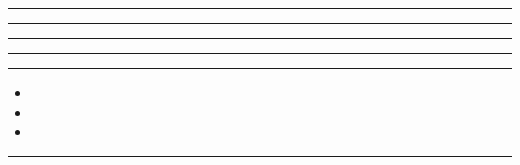 \documentclass[11pt,a4paper]{article}
\begin{document}
\swarmwrapnext\lipsum[1]\lipsum[2]\lipsum[3]\lipsum[4]\lipsum[5]\lipsum[6]
\begin{swarmwrap}%
  \begin{minipage}[t]{4cm}
    \centering
    \textcolor{red!20}{\rule{\linewidth}{8cm}}
  \end{minipage}%
\end{swarmwrap}%
\swarmwrapnext\lipsum[1]
\begin{swarmwrap}%
  \begin{minipage}[t]{5cm}
    \centering
    \textcolor{red!20}{\rule{\linewidth}{9cm}}
  \end{minipage}%
\end{swarmwrap}%
\swarmwrapnext\lipsum[1]\lipsum[2]
\begin{swarmwrap}%
  \begin{minipage}[t]{2cm}
    \centering
    \textcolor{red!20}{\rule{\linewidth}{10cm}}
  \end{minipage}%
\end{swarmwrap}%
\swarmwrapnext\lipsum[1]\lipsum[2]\lipsum[3]
\begin{swarmwrap}%
  \begin{minipage}[t]{3cm}
    \centering
    \textcolor{red!20}{\rule{\linewidth}{2cm}}
  \end{minipage}%
\end{swarmwrap}%
\swarmwrapnext\lipsum[1]\lipsum[2]\lipsum[3]\lipsum[4]
\begin{swarmwrap}%
  \begin{minipage}[t]{4cm}
    \centering
    \textcolor{green!30}{\rule{\linewidth}{3cm}}
  \end{minipage}%
\end{swarmwrap}%
\swarmwrapnext
\begin{itemize}
  \item \lipsum[1][1-3]
  \item \lipsum[2][1-3]
  \item \lipsum[3][1-3]
\end{itemize}
\begin{swarmwrap}%
  \begin{minipage}[t]{5cm}
    \centering
    \textcolor{red!20}{\rule{\linewidth}{4cm}}
  \end{minipage}%
\end{swarmwrap}%
\end{document}
